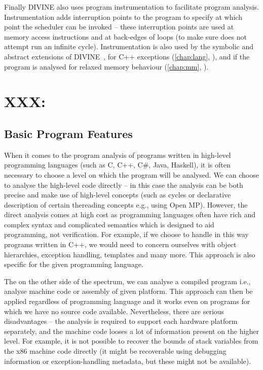 Finally DIVINE also uses program instrumentation to facilitate program
analysis.
Instrumentation adds interruption points to the program to specify at which
point the scheduler can be invoked -- these interruption points are used at
memory access instructions and at back-edges of loops (to make sure \divm does
not attempt run an infinite cycle).
Instrumentation is also used by the symbolic and abstract extensions of
DIVINE~, for C++ exceptions (\autoref{chap:lang},
), and if the program is analysed for relaxed memory behaviour
(\autoref{chap:mm}, ).


\section{XXX:}

\subsection{Basic Program Features}

When it comes to the program analysis of programs written in high-level programming languages (such as C, C++, C\#, Java, Haskell), it is often necessary to choose a level on which the program will be analysed.
We can choose to analyse the high-level code directly -- in this case the analysis can be both precise and make use of high-level concepts (such as cycles or declarative description of certain thereading concepts e.g., using Open MP).
However, the direct analysis comes at high cost as programming languages often have rich and complex syntax and complicated semantics which is designed to aid programming, not verification.
For example, if we choose to handle in this way programs written in C++, we would need to concern ourselves with object hierarchies, exception handling, templates and many more.
This approach is also specific for the given programming language.


The on the other side of the spectrum, we can analyse a compiled program i.e., analyse machine code or assembly of given platform.
This approach can then be applied regardless of programming language and it works even on programs for which we have no source code available.
Nevertheless, there are serious disadvantages -- the analysis is required to support each hardware platform separately, and the machine code looses a lot of information present on the higher level.
For example, it is not possible to recover the bounds of stack variables from the x86 machine code directly (it might be recoverable using debugging information or exception-handling metadata, but these might not be available).

